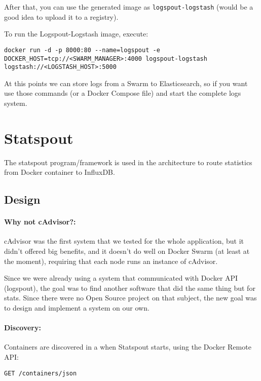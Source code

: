 After that, you can use the generated image as 
\texttt{logspout-logstash} (would be a good idea to upload it
to a registry).

To run the Logspout-Logstash image, execute:

\begin{lstlisting}
docker run -d -p 8000:80 --name=logspout -e DOCKER_HOST=tcp://<SWARM_MANAGER>:4000 logspout-logstash logstash://<LOGSTASH_HOST>:5000
\end{lstlisting}

At this points we can store logs from a Swarm to Elasticsearch, so if you want use those commands (or a Docker Compose file) and start the complete logs system.

\section{Statspout}

The statspout program/framework is used in the architecture to route statistics from Docker container to InfluxDB.

\subsection{Design}

\paragraph{Why not cAdvisor?:} cAdvisor was the first system that we tested for the whole application, but it didn't offered big benefits, and it doesn't do well on Docker Swarm (at least at the moment), requiring that each node runs an instance of cAdvisor.

Since we were already using a system that communicated with Docker API (logspout), the goal was to find another software that did the same thing but for stats. Since there were no Open Source project on that subject, the new goal was to design and implement a system on our own.

\paragraph{Discovery:} Containers are discovered in a when Statspout starts, using the Docker Remote API:

\begin{lstlisting}
GET /containers/json
\end{lstlisting}

